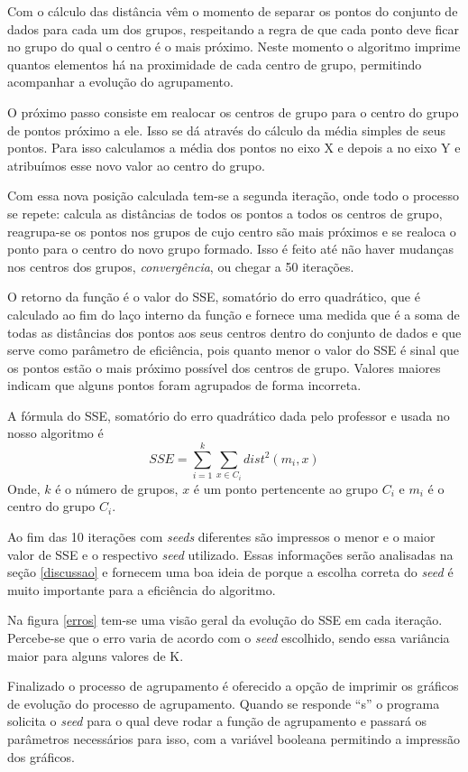 \documentclass[12pt, a4paper]{article}
\begin{document}
Com o cálculo das distância vêm o momento de separar os pontos do conjunto de dados para cada um dos grupos, respeitando a regra de que cada ponto deve ficar no grupo do qual o centro é o mais próximo. Neste momento o algoritmo imprime quantos elementos há na proximidade de cada centro de grupo, permitindo acompanhar a evolução do agrupamento.

O próximo passo consiste em realocar os centros de grupo para o centro do grupo de pontos próximo a ele. Isso se dá através do cálculo da média simples de seus pontos. Para isso calculamos a média dos pontos no eixo X e depois a no eixo Y e atribuímos esse novo valor ao centro do grupo.

Com essa nova posição calculada tem-se a segunda iteração, onde todo o processo se repete: calcula as distâncias de todos os pontos a todos os centros de grupo, reagrupa-se os pontos nos grupos de cujo centro são mais próximos e se realoca o ponto para o centro do novo grupo formado. Isso é feito até não haver mudanças nos centros dos grupos, \emph{convergência}, ou chegar a 50 iterações.

O retorno da função é o valor do SSE, somatório do erro quadrático, que é calculado ao fim do laço interno da função e fornece uma medida que é a soma de todas as distâncias dos pontos aos seus centros dentro do conjunto de dados e que serve como parâmetro de eficiência, pois quanto menor o valor do SSE é sinal que os pontos estão o mais próximo possível dos centros de grupo. Valores maiores indicam que alguns pontos foram agrupados de forma incorreta.

A fórmula do SSE, somatório do erro quadrático dada pelo professor e usada no nosso algoritmo é $$SSE = \sum_{i=1}^k \sum_{x\in C_i} dist^2(m_i,x)$$ Onde, $k$ é o número de grupos, $x$ é um ponto pertencente ao grupo $C_i$ e $m_i$ é o centro do grupo $C_i$.

Ao fim das 10 iterações com \textit{seeds} diferentes são impressos o menor e o maior valor de SSE e o respectivo \textit{seed} utilizado. Essas informações serão analisadas na seção \ref{discussao} e fornecem uma boa ideia de porque a escolha correta do \textit{seed} é muito importante para a eficiência do algoritmo.

Na figura \ref{erros} tem-se uma visão geral da evolução do SSE em cada iteração. Percebe-se que o erro varia de acordo com o \textit{seed} escolhido, sendo essa variância maior para alguns valores de K.

Finalizado o processo de agrupamento é oferecido a opção de imprimir os gráficos de evolução do processo de agrupamento. Quando se responde ``s'' o programa solicita o \textit{seed} para o qual deve rodar a função de agrupamento e passará os parâmetros necessários para isso, com a variável booleana permitindo a impressão dos gráficos.
\end{document}
